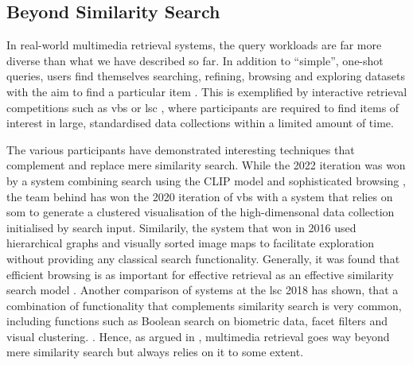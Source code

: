 \subsection{Beyond Similarity Search}
In real-world multimedia retrieval systems, the query workloads are far more diverse than what we have described so far. In addition to ``simple'', one-shot queries, users find themselves searching, refining, browsing and exploring datasets with the aim to find a particular item \cite{Lokovc:2019Interactive,Rossetto:2020Interactive}. This is exemplified by interactive retrieval competitions such as \acrfull{vbs} \cite{Schoeffmann:2019Video,Lokovc:2018Influential} or \acrfull{lsc} \cite{Gurrin:2021Introduction}, where participants are required to find items of interest in large, standardised data collections \cite{Berns:2019V3C1,Rossetto:2021Insights} within a limited amount of time.

The various participants have demonstrated interesting techniques that complement and replace mere similarity search. While the 2022 iteration was won by a system combining search using the CLIP model \cite{Radford:2021Learning} and sophisticated browsing \cite{Hezel:2022Efficient}, the team behind \cite{Kratochvil:2020SOM} has won the 2020 iteration of \acrshort{vbs} with a system that relies on \acrfull{som} \cite{Kohonen:1990Self} to generate a clustered visualisation of the high-dimensonal data collection initialised by search input. Similarily, the system that won in 2016 used \cite{Barthel:2016Navigating} hierarchical graphs and visually sorted image maps to facilitate exploration without providing any classical search functionality. Generally, it was found that efficient browsing is as important for effective retrieval as an effective similarity search model \cite{Lokovc:2019Interactive}. Another comparison of systems at the \acrshort{lsc} 2018 has shown, that a combination of functionality that complements similarity search is very common, including functions such as Boolean search on biometric data, facet filters and visual clustering. \cite{Gurrin:2019Invited}. Hence, as argued in , multimedia retrieval goes way beyond mere similarity search but always relies on it to some extent.